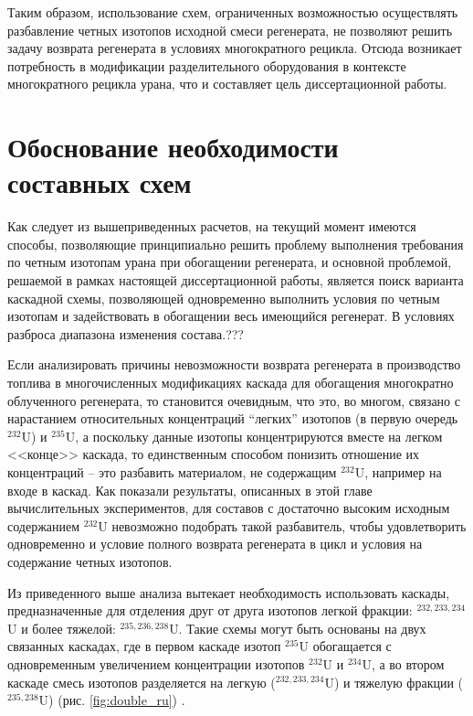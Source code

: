 Таким образом, использование схем, ограниченных возможностью осуществлять разбавление четных изотопов исходной смеси регенерата, не позволяют решить задачу возврата регенерата в условиях многократного рецикла. Отсюда возникает потребность в модификации разделительного оборудования в контексте многократного рецикла урана, что и составляет цель диссертационной работы.


\section{Обоснование необходимости составных схем}\label{sec:ch2/sec2}

Как следует из вышеприведенных расчетов, на текущий момент имеются способы, позволяющие принципиально решить проблему выполнения требования по четным изотопам урана при обогащении регенерата, и основной проблемой, решаемой в рамках настоящей диссертационной работы, является поиск варианта каскадной схемы, позволяющей одновременно выполнить условия по четным изотопам и задействовать в обогащении весь имеющийся регенерат. В условиях разброса диапазона изменения состава.???

Если анализировать причины невозможности возврата регенерата в производство топлива в многочисленных модификациях каскада для обогащения многократно облученного регенерата, то становится очевидным, что это, во многом, связано с нарастанием относительных концентраций “легких” изотопов (в первую очередь $^{232}$U) и
$^{235}$U, а поскольку данные изотопы концентрируются вместе на легком <<конце>> каскада, то единственным способом понизить отношение их концентраций -- это разбавить материалом, не содержащим $^{232}$U, например на входе в каскад. Как показали результаты, описанных в этой главе вычислительных экспериментов, для составов с достаточно высоким исходным содержанием $^{232}$U невозможно подобрать такой разбавитель, чтобы удовлетворить одновременно и условие полного возврата регенерата в цикл и условия на содержание четных изотопов.

Из приведенного выше анализа вытекает необходимость использовать каскады, предназначенные для отделения друг от друга изотопов легкой фракции: $^{232,233,234}$U и более тяжелой: $^{235,236,238}$U. Такие схемы могут быть основаны на двух связанных каскадах, где в первом каскаде изотоп $^{235}$U обогащается с одновременным увеличением концентрации изотопов $^{232}$U и $^{234}$U, а во втором каскаде смесь изотопов разделяется на легкую ($^{232,233,234}$U) и тяжелую фракции ($^{235,238}$U) (рис. \ref{fig:double_ru}) \cite{smirnovApplyingEnrichmentCapacities2018}.


